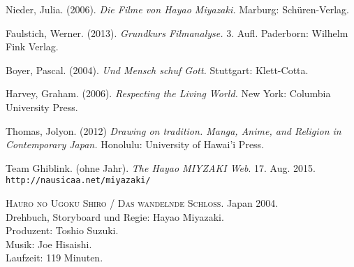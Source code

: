 \documentclass[a4paper]{article}
\begin{document}
\newpage
\begin{thebibliography}{9}

	Nieder, Julia. 
	(2006). 
	\emph{Die Filme von Hayao Miyazaki.}
	Marburg: Schüren-Verlag.

	Faulstich, Werner.
	(2013).
	\emph{Grundkurs Filmanalyse.} 
	3. Aufl. 
	Paderborn: Wilhelm Fink Verlag.

	Boyer, Pascal.
	(2004).
	\emph{Und Mensch schuf Gott.}
	Stuttgart: Klett-Cotta.

	Harvey, Graham.
	(2006).
	\emph{Respecting the Living World.}
	New York: Columbia University Press.

	Thomas, Jolyon.
	(2012)
	\emph{Drawing on tradition. Manga, Anime, and Religion in Contemporary Japan.}
	Honolulu: University of Hawai'i Press.

	Team Ghiblink. 
	(ohne Jahr). 
	\emph{The Hayao MIYZAKI Web}. 
	17. Aug. 2015. 
	\texttt{http://nausicaa.net/miyazaki/}

	\textsc{Hauro no Ugoku Shiro / Das wandelnde Schloss}.
	Japan 2004. \\
	Drehbuch, Storyboard und Regie: Hayao Miyazaki.\\
	Produzent: Toshio Suzuki. \\
	Musik: Joe Hisaishi. \\
	Laufzeit: 119 Minuten. \\

\end{thebibliography}
\end{document}
